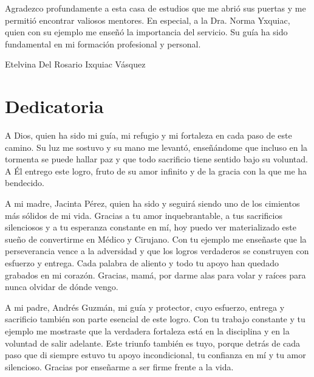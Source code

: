 \documentclass[11pt,letterpaper]{report}
\begin{document}
Agradezco profundamente a esta casa de estudios que me abrió sus puertas y me 
permitió encontrar valiosos mentores. En especial, a la Dra. Norma Yxquiac, 
quien con su ejemplo me enseñó la importancia del servicio. Su guía ha sido 
fundamental en mi formación profesional y personal.




\begin{flushright}
Etelvina Del Rosario Ixquiac Vásquez
\end{flushright}

\chapter*{Dedicatoria}
A Dios, quien ha sido mi guía, mi refugio y mi fortaleza en cada paso de este 
camino. Su luz me sostuvo y su mano me levantó, enseñándome que incluso en la 
tormenta se puede hallar paz y que todo sacrificio tiene sentido bajo su 
voluntad. A Él entrego este logro, fruto de su amor infinito y de la gracia 
con la que me ha bendecido.

A mi madre, Jacinta Pérez, quien ha sido y seguirá siendo uno de los cimientos 
más sólidos de mi vida. Gracias a tu amor inquebrantable, a tus sacrificios 
silenciosos y a tu esperanza constante en mí, hoy puedo ver materializado este 
sueño de convertirme en Médico y Cirujano. Con tu ejemplo me enseñaste que la 
perseverancia vence a la adversidad y que los logros verdaderos se construyen 
con esfuerzo y entrega. Cada palabra de aliento y todo tu apoyo han quedado 
grabados en mi corazón. Gracias, mamá, por darme alas para volar y raíces 
para nunca olvidar de dónde vengo.

A mi padre, Andrés Guzmán, mi guía y protector, cuyo esfuerzo, entrega y 
sacrificio también son parte esencial de este logro. Con tu trabajo constante 
y tu ejemplo me mostraste que la verdadera fortaleza está en la disciplina y 
en la voluntad de salir adelante. Este triunfo también es tuyo, porque detrás 
de cada paso que di siempre estuvo tu apoyo incondicional, tu confianza en mí 
y tu amor silencioso. Gracias por enseñarme a ser firme frente a la vida.
\end{document}
